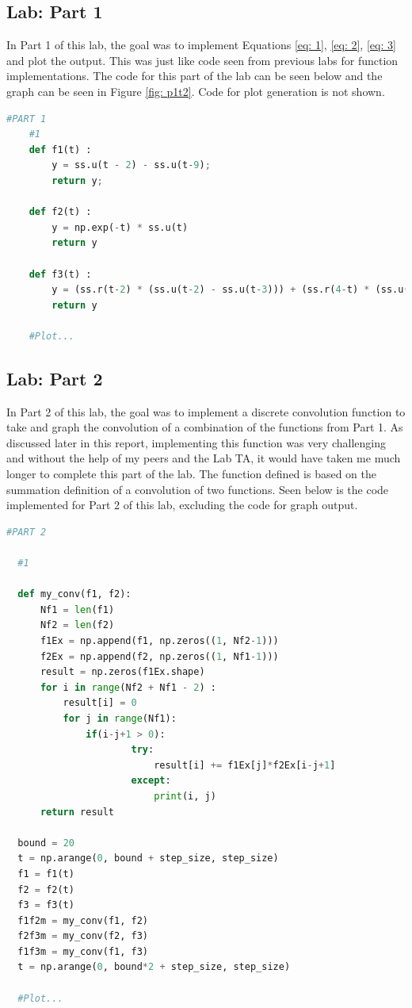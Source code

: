 \documentclass[12pt]{report}
\begin{document}
\subsection{Lab: Part 1}
In Part 1 of this lab, the goal was to implement Equations \eqref{eq: 1}, \eqref{eq: 2}, \eqref{eq: 3} and plot the output. This was just like code seen from 
previous labs for function implementations. The code for this part of the lab can be seen below and the graph can be seen in Figure \ref{fig: p1t2}. Code for 
plot generation is not shown. 
\begin{lstlisting}[language=Python, basicstyle=\footnotesize]
    #PART 1
    #1
    def f1(t) :
        y = ss.u(t - 2) - ss.u(t-9);
        return y;
    
    def f2(t) :
        y = np.exp(-t) * ss.u(t)
        return y
    
    def f3(t) :
        y = (ss.r(t-2) * (ss.u(t-2) - ss.u(t-3))) + (ss.r(4-t) * (ss.u(t-3) - ss.u(t-4)))
        return y

    #Plot...
\end{lstlisting}
\subsection{Lab: Part 2}
In Part 2 of this lab, the goal was to implement a discrete convolution function to take and graph the convolution of a combination of the functions from Part 1. 
As discussed later in this report, implementing this function was very challenging and without the help of my peers and the Lab TA, it would have taken me much longer
to complete this part of the lab. The function defined is based on the summation definition of a convolution of two functions. Seen below is the code implemented for
Part 2 of this lab, excluding the code for graph output. 
\begin{lstlisting}[language=Python, basicstyle=\footnotesize]
  #PART 2

  #1
      
  def my_conv(f1, f2):
      Nf1 = len(f1)
      Nf2 = len(f2)
      f1Ex = np.append(f1, np.zeros((1, Nf2-1)))
      f2Ex = np.append(f2, np.zeros((1, Nf1-1)))
      result = np.zeros(f1Ex.shape)
      for i in range(Nf2 + Nf1 - 2) :
          result[i] = 0
          for j in range(Nf1):
              if(i-j+1 > 0):
                      try:
                          result[i] += f1Ex[j]*f2Ex[i-j+1]
                      except:
                          print(i, j)
      return result

  bound = 20
  t = np.arange(0, bound + step_size, step_size)
  f1 = f1(t)
  f2 = f2(t)
  f3 = f3(t)
  f1f2m = my_conv(f1, f2)
  f2f3m = my_conv(f2, f3)
  f1f3m = my_conv(f1, f3)
  t = np.arange(0, bound*2 + step_size, step_size)

  #Plot...
\end{lstlisting}
\end{document}
